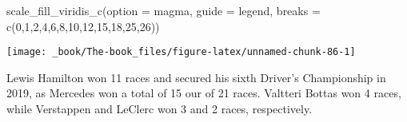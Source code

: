 \documentclass[
]{book}
\newenvironment{Shaded}{\begin{snugshade}}{\end{snugshade}}
\newcommand{\AttributeTok}[1]{\textcolor[rgb]{0.77,0.63,0.00}{#1}}
\newcommand{\DecValTok}[1]{\textcolor[rgb]{0.00,0.00,0.81}{#1}}
\newcommand{\FunctionTok}[1]{\textcolor[rgb]{0.00,0.00,0.00}{#1}}
\newcommand{\NormalTok}[1]{#1}
\newcommand{\StringTok}[1]{\textcolor[rgb]{0.31,0.60,0.02}{#1}}
\begin{document}
\begin{Shaded}
\begin{Highlighting}[]
  \FunctionTok{scale\_fill\_viridis\_c}\NormalTok{(}\AttributeTok{option =} \StringTok{\textquotesingle{}magma\textquotesingle{}}\NormalTok{,}
                       \AttributeTok{guide =} \StringTok{\textquotesingle{}legend\textquotesingle{}}\NormalTok{,}
                       \AttributeTok{breaks =} \FunctionTok{c}\NormalTok{(}\DecValTok{0}\NormalTok{,}\DecValTok{1}\NormalTok{,}\DecValTok{2}\NormalTok{,}\DecValTok{4}\NormalTok{,}\DecValTok{6}\NormalTok{,}\DecValTok{8}\NormalTok{,}\DecValTok{10}\NormalTok{,}\DecValTok{12}\NormalTok{,}\DecValTok{15}\NormalTok{,}\DecValTok{18}\NormalTok{,}\DecValTok{25}\NormalTok{,}\DecValTok{26}\NormalTok{))}
\end{Highlighting}
\end{Shaded}

\begin{center}\texttt{[image: \_book/The-book\_files/figure-latex/unnamed-chunk-86-1]} \end{center}

Lewis Hamilton won 11 races and secured his sixth Driver's Championship in 2019, as Mercedes won a total of 15 our of 21 races. Valtteri Bottas won 4 races, while Verstappen and LeClerc won 3 and 2 races, respectively.
\end{document}
